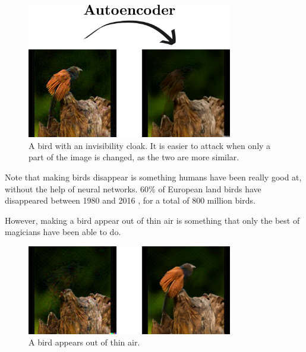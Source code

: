 \documentclass[]{scrarticle}
\begin{document}
\begin{figure}[h]
  \centering
  \includegraphics[width=0.8\textwidth]{../images/bird-no-bird.png}
  \caption{
    A bird with an invisibility cloak.
    It is easier to attack when only a part of the image is changed,
    as the two are more similar.
  }
\end{figure}

Note that making birds disappear is something humans have been really good at,
without the help of neural networks.
60\% of European land birds have disappeared between 1980 and 2016
\cite{Rigal2023FarmlandPA}, for a total of 800 million birds.

However, making a bird appear out of thin air is something that
only the best of magicians have been able to do.

\begin{figure}[h]
  \centering
  \includegraphics[width=0.8\textwidth]{../images/bird-resurected.png}
  \caption{
    A bird appears out of thin air.
  }
\end{figure}







\clearpage


\end{document}
